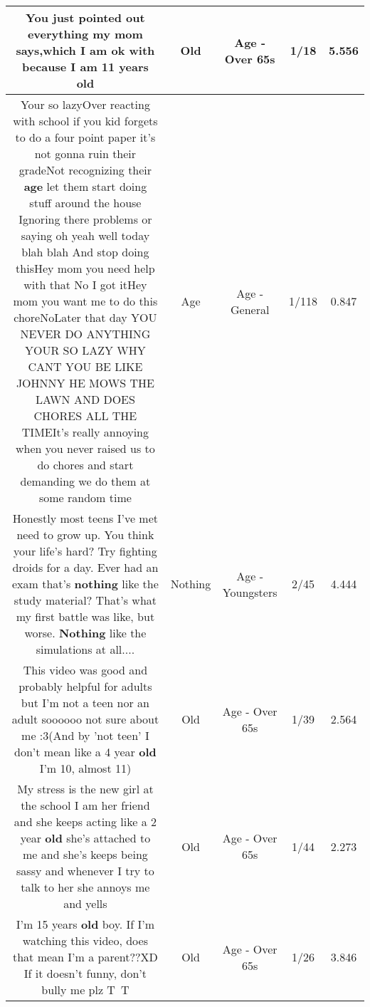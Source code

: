 \documentclass[11pt]{article}
\newlength\mylength
\begin{document}
\begin{center}
\begin{longtable}{|C{.65\mylength}|C{.30\mylength}|C{.12\mylength}|C{.12\mylength}|C{.12\mylength}|}
  \small You just pointed out everything my mom says,which I am ok with because  I am 11 years old\normalsize   & Old & Age - Over 65s & 1/18 & 5.556 \\  \hline
  \small Your so lazyOver reacting with school if you kid forgets to do a four point paper it's not gonna ruin their gradeNot recognizing their \textbf{age} let them start doing stuff around the house Ignoring there problems or saying oh yeah well today blah blah And stop doing thisHey mom you need help with that No I got itHey mom you want me to do this choreNoLater that day YOU NEVER DO ANYTHING YOUR SO LAZY WHY CANT YOU BE LIKE JOHNNY HE MOWS THE LAWN AND DOES CHORES ALL THE TIMEIt's  really annoying when you never raised us to do chores and start demanding we do them at some random time\normalsize   & Age & Age - General & 1/118 & 0.847 \\  \hline
  \small Honestly most teens I've met need to grow up. You think your life's hard? Try fighting droids for a day. Ever had an exam that's \textbf{nothing} like the study material? That's what my first battle was like, but worse. \textbf{Nothing} like the simulations at all....\normalsize   & Nothing & Age - Youngsters & 2/45 & 4.444 \\  \hline
  \small This video was good and probably helpful for adults but I'm not a teen nor an adult soooooo not sure about me :3(And by 'not teen' I don't mean like a 4 year \textbf{old} I'm 10, almost 11)\normalsize   & Old & Age - Over 65s & 1/39 & 2.564 \\  \hline
  \small My stress is the new girl at the school I am her friend and she keeps acting like a 2 year \textbf{old} she's attached to me and she's keeps being sassy and whenever I try to talk to her she annoys me and yells\normalsize   & Old & Age - Over 65s & 1/44 & 2.273 \\  \hline
  \small I'm 15 years \textbf{old} boy. If I'm watching this video, does that mean I'm a parent??XD If it doesn't funny, don't bully me plz T~T\normalsize   & Old & Age - Over 65s & 1/26 & 3.846 \\  \hline

\end{longtable}
\end{center}
\end{document}
